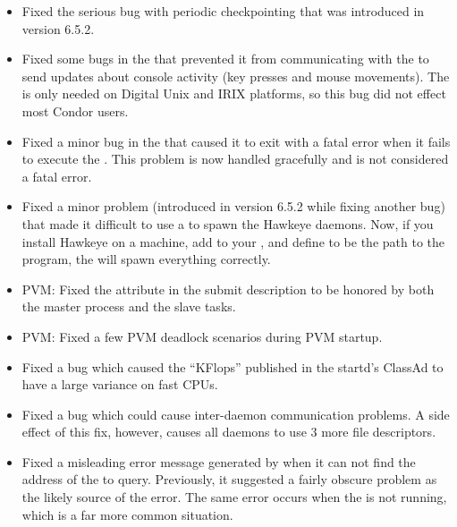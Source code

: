 \begin{itemize}

\item Fixed the serious bug with periodic checkpointing that was
  introduced in version 6.5.2.

\item Fixed some bugs in the  that prevented it from
  communicating with the  to send updates about console
  activity (key presses and mouse movements).
  The  is only needed on Digital Unix and IRIX platforms,
  so this bug did not effect most Condor users.

\item Fixed a minor bug in the  that caused it to exit
  with a fatal error when it fails to execute the . 
  This problem is now handled gracefully and is not considered a fatal
  error. 

\item Fixed a minor problem (introduced in version 6.5.2 while fixing
  another bug) that made it difficult to use a  to
  spawn the Hawkeye daemons.
  Now, if you install Hawkeye on a machine, add \verb@HAWKEYE@ to your
  , and define  to be the path to
  the  program, the  will spawn
  everything correctly.

\item PVM: Fixed the  attribute in the submit description 
		to be honored by both the master process and the slave tasks.

\item PVM: Fixed a few PVM deadlock scenarios during PVM startup.

\item Fixed a bug which caused the ``KFlops'' published in the
startd's ClassAd to have a large variance on fast CPUs.

\item Fixed a bug which could cause inter-daemon communication
problems.  A side effect of this fix, however, causes all daemons to
use 3 more file descriptors.

\item Fixed a misleading error message generated by  when it
  can not find the address of the  to query.
  Previously, it suggested a fairly obscure problem as the likely
  source of the error.
  The same error occurs when the  is not running, which
  is a far more common situation.

\end{itemize}

